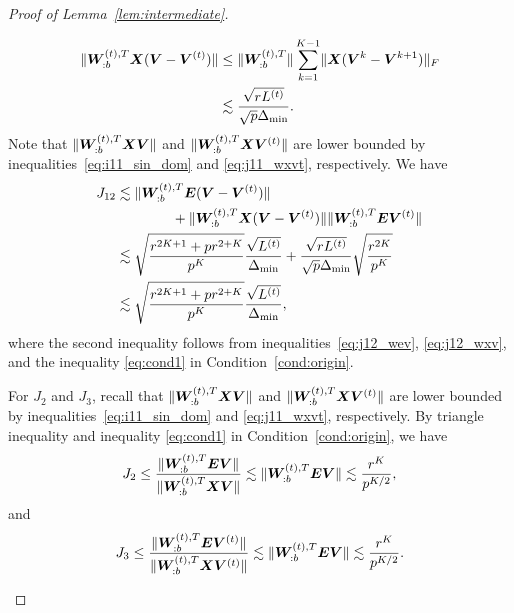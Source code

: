 \documentclass[journal]{IEEEtran}
\theoremstyle{definition}
\theoremstyle{definition}
\begin{document}
\begin{proof}[Proof of Lemma~\ref{lem:intermediate}]
\begin{enumerate}[wide]
    \vspace{-0.5cm}
    \small
    \begin{align}
        \onormSize{}{\mW_{:b}^{(t),T} \mX (\mV-\mV^{(t)})}&\leq \onormSize{}{\mW_{:b}^{(t),T} }  \sum_{k = 1}^{K-1} \onormSize{}{\mX (\mV^k-\mV^{k+1})}_F \\ &\lesssim \frac{ \sqrt{r L^{(t)}}}{\sqrt{p} \Delta_{\min}}.\label{eq:j12_wxv}
    \end{align}
    \normalsize
    Note that $\lVert\bm{W}_{:b}^{(t),T} \bm X \bm{V} \rVert$ and $\lVert\bm{W}_{:b}^{(t),T} \bm X \bm{V}^{(t)} \rVert$ are lower bounded by inequalities~\eqref{eq:i11_sin_dom} and \eqref{eq:j11_wxvt}, respectively. We have 
    \begin{align}
        J_{12} &\lesssim \lVert\bm{W}_{:b}^{(t),T} \bm{E} (\bm{V}-\bm{V}^{(t)})\rVert \\
        & \quad \quad \quad \quad + \lVert\bm{W}_{:b}^{(t),T} \bm X (\bm{V}-\bm{V}^{(t)})\rVert\lVert\bm{W}_{:b}^{(t),T} \bm{E} \bm{V}^{(t)} \rVert\\
        &\lesssim \sqrt{ \frac{r^{2K+1} + p r^{2 + K}}{p^K} } \frac{\sqrt{L^{(t)}}}{\Delta_{\min}} + \frac{ \sqrt{r L^{(t)}}}{\sqrt{p} \Delta_{\min}} \sqrt{\frac{r^{2K}}{p^K}} \\
        & \lesssim  \sqrt{ \frac{r^{2K+1} + p r^{2 + K}}{p^K} } \frac{\sqrt{L^{(t)}}}{\Delta_{\min}},
    \end{align}
    where the second inequality follows from inequalities~\eqref{eq:j12_wev}, \eqref{eq:j12_wxv}, and the inequality \eqref{eq:cond1} in Condition~\ref{cond:origin}.
    
    
    For $J_2$ and $J_3$, recall that $\lVert\bm{W}_{:b}^{(t),T} \bm X \bm{V} \rVert$ and $\lVert\bm{W}_{:b}^{(t),T} \bm X \bm{V}^{(t)} \rVert$ are lower bounded by inequalities~\eqref{eq:i11_sin_dom} and \eqref{eq:j11_wxvt}, respectively. By triangle inequality and inequality \eqref{eq:cond1} in Condition~\ref{cond:origin}, we have 
    \begin{equation}\label{eq:j2}
        J_2 \leq \frac{ \onormSize{}{\mW_{:b}^{(t),T} \mE \mV}  }{  \onormSize{}{\mW_{:b}^{(t),T} \mX \mV} } \lesssim \onormSize{}{\mW_{:b}^{(t),T} \mE \mV} \lesssim \frac{r^K}{p^{K/2}},
    \end{equation}
    and 
    \begin{equation}\label{eq:j3}
        J_3 \leq \frac{ \onormSize{}{\mW_{:b}^{(t),T} \mE \mV^{(t)}}  }{  \onormSize{}{\mW_{:b}^{(t),T} \mX \mV^{(t)}} } \lesssim \onormSize{}{\mW_{:b}^{(t),T} \mE \mV} \lesssim \frac{r^K}{p^{K/2}}.
    \end{equation}
    

\end{enumerate}
\end{proof}
\end{document}
